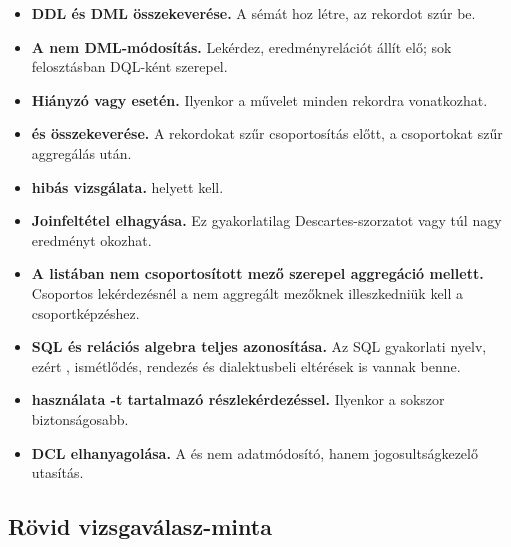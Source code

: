 \begin{itemize}
  \item \textbf{DDL és DML összekeverése.} A  sémát hoz létre, az  rekordot szúr be.
  \item \textbf{A  nem DML-módosítás.} Lekérdez, eredményrelációt állít elő; sok felosztásban DQL-ként szerepel.
  \item \textbf{Hiányzó   vagy  esetén.} Ilyenkor a művelet minden rekordra vonatkozhat.
  \item \textbf{ és  összekeverése.} A  rekordokat szűr csoportosítás előtt, a  csoportokat szűr aggregálás után.
  \item \textbf{ hibás vizsgálata.}  helyett  kell.
  \item \textbf{Joinfeltétel elhagyása.} Ez gyakorlatilag Descartes-szorzatot vagy túl nagy eredményt okozhat.
  \item \textbf{A  listában nem csoportosított mező szerepel aggregáció mellett.} Csoportos lekérdezésnél a nem aggregált mezőknek illeszkedniük kell a csoportképzéshez.
  \item \textbf{SQL és relációs algebra teljes azonosítása.} Az SQL gyakorlati nyelv, ezért , ismétlődés, rendezés és dialektusbeli eltérések is vannak benne.
  \item \textbf{ használata -t tartalmazó részlekérdezéssel.} Ilyenkor a  sokszor biztonságosabb.
  \item \textbf{DCL elhanyagolása.} A  és  nem adatmódosító, hanem jogosultságkezelő utasítás.
\end{itemize}

\subsection{Rövid vizsgaválasz-minta}

